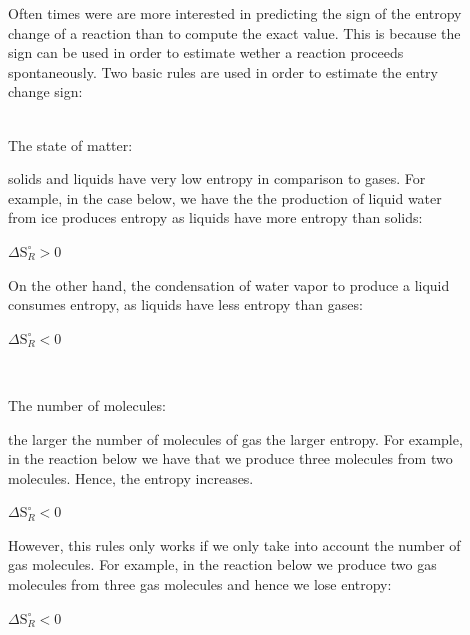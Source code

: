 \documentclass[main.tex]{subfiles}
\begin{document}
\begin{description}
\item[]
Often times were are more interested in predicting the sign of the entropy change of a reaction than to compute the exact value. This is because the sign can be used in order to estimate wether a reaction proceeds spontaneously. Two basic rules are used in order to estimate the entry change sign:
\\ \faCodeFork\ \begin{bf}The state of matter:\end{bf} solids and liquids have very low entropy in comparison to gases. For example, in the case below, we have the the production of liquid water from ice produces entropy as liquids have more entropy than solids:
 \begin{center}  \hfill $\Delta \text{S}_R^{\circ}>0$\end{center}
On the other hand, the condensation of water vapor to produce a liquid consumes entropy, as liquids have less entropy than gases:
 \begin{center}  \hfill $\Delta \text{S}_R^{\circ}<0$\end{center}
  \faCodeFork\ \begin{bf}The number of molecules:\end{bf} the larger the number of molecules of gas the larger entropy. For example, in the reaction below we have that we produce three molecules from two molecules. Hence, the entropy increases.
 \begin{center}  \hfill $\Delta \text{S}_R^{\circ}<0$\end{center}
However, this rules only works if we only take into account the number of gas molecules. For example, in the reaction below we produce two gas molecules from three gas molecules and hence we lose entropy:
 \begin{center} \hfill $\Delta \text{S}_R^{\circ}<0$\end{center}


\end{description}
\end{document}

